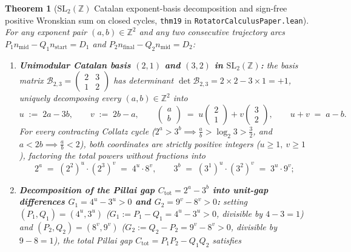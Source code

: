 \documentclass[11pt,a4paper]{article}
\newtheorem{theorem}{Theorem}[section]
\theoremstyle{definition}
\theoremstyle{remark}
\begin{document}
\begin{theorem}[$\mathrm{SL}_2(\mathbb{Z})$ Catalan exponent-basis decomposition and sign-free positive Wronskian sum on closed cycles, \texttt{thm19} in \texttt{RotatorCalculusPaper.lean}]
\label{thm:catalan-basis-positive-wronskian}
For any exponent pair $(a,b)\in\mathbb{Z}^2$ and any two consecutive trajectory arcs $P_1 n_{\mathrm{mid}} - Q_1 n_{\mathrm{start}} = D_1$ and $P_2 n_{\mathrm{final}} - Q_2 n_{\mathrm{mid}} = D_2$:
\begin{enumerate}[label=\textbf{(\roman*)},leftmargin=*]
\item \textbf{Unimodular Catalan basis $(2,1)$ and $(3,2)$ in $\mathrm{SL}_2(\mathbb{Z})$:}
  the basis matrix $\mathcal{B}_{2,3} = \begin{pmatrix} 2 & 3 \\ 1 & 2 \end{pmatrix}$ has determinant $\det\mathcal{B}_{2,3} = 2\times 2 - 3\times 1 = +1$, uniquely decomposing every $(a,b)\in\mathbb{Z}^2$ into
  \begin{equation}
    \label{eq:catalan-uv-coords}
    u \;:=\; 2a - 3b, \qquad v \;:=\; 2b - a, \qquad
    \begin{pmatrix} a \\ b \end{pmatrix} \;=\; u\begin{pmatrix} 2 \\ 1 \end{pmatrix} + v\begin{pmatrix} 3 \\ 2 \end{pmatrix}, \qquad
    u + v \;=\; a - b.
  \end{equation}
  For every contracting Collatz cycle ($2^a > 3^b \implies \frac{a}{b} > \log_2 3 > \frac{3}{2}$, and $a < 2b \implies \frac{a}{b} < 2$), both coordinates are strictly positive integers ($u \ge 1,\ v \ge 1$), factoring the total powers without fractions into
  \begin{equation}
    \label{eq:power-factorization-4-3-8-9}
    2^a \;=\; (2^2)^u\cdot(2^3)^v \;=\; 4^u\cdot 8^v, \qquad
    3^b \;=\; (3^1)^u\cdot(3^2)^v \;=\; 3^u\cdot 9^v;
  \end{equation}
\item \textbf{Decomposition of the Pillai gap $C_{\mathrm{tot}} = 2^a - 3^b$ into unit-gap differences $G_1 = 4^u - 3^u > 0$ and $G_2 = 9^v - 8^v > 0$:}
  setting $(P_1,Q_1) = (4^u,3^u)$ ($G_1 := P_1 - Q_1 = 4^u - 3^u > 0$, divisible by $4 - 3 = 1$) and $(P_2,Q_2) = (8^v,9^v)$ ($G_2 := Q_2 - P_2 = 9^v - 8^v > 0$, divisible by $9 - 8 = 1$), the total Pillai gap $C_{\mathrm{tot}} = P_1 P_2 - Q_1 Q_2$ satisfies

\end{enumerate}
\end{theorem}
\end{document}

